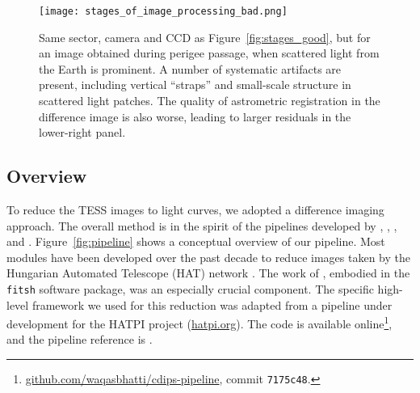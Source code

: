 \documentclass[12pt,twocolumn,tighten]{aastex62}
\begin{document}
\begin{figure}[!t]
    \begin{center}
        \leavevmode
        \texttt{[image: stages\_of\_image\_processing\_bad.png]}
    \end{center}
    \vspace{-0.7cm}
    \caption{
        Same sector, camera and CCD as Figure~\ref{fig:stages_good},
        but for an image obtained during perigee passage, when
        scattered light from the Earth is prominent.  A number of
        systematic artifacts are present, including vertical
        ``straps'' and small-scale structure in scattered light
        patches.  The quality of astrometric registration in the
        difference image is also worse, leading to larger residuals in
        the lower-right panel.
        \label{fig:stages_bad}
    }
\end{figure}

\subsection{Overview}

To reduce the TESS images to light curves, we adopted a difference
imaging approach.  The overall method is in the spirit of the
pipelines developed by \citet{Pal_2009},
\citet{huang_high-precision_2015}, \citet{soares-furtado_image_2017},
\citet{oelkers_precision_2018} and \citet{wallace_search_2019}.
Figure~\ref{fig:pipeline} shows a conceptual overview of our pipeline.
Most modules have been developed over the past decade to reduce images
taken by the Hungarian Automated Telescope (HAT) network
\citep{bakos_hat_review_2018}.  The work of \citet{Pal_2009}, embodied
in the \texttt{fitsh} software package, was an especially crucial
component.  The specific high-level framework we used for this
reduction was adapted from a pipeline under development for the HATPI
project (\url{hatpi.org}).  The code is available
online\footnote{\url{github.com/waqasbhatti/cdips-pipeline}, commit
\texttt{7175c48}.}, and the pipeline reference is
\citet{bhatti_cdips-pipeline_2019}.
\end{document}
